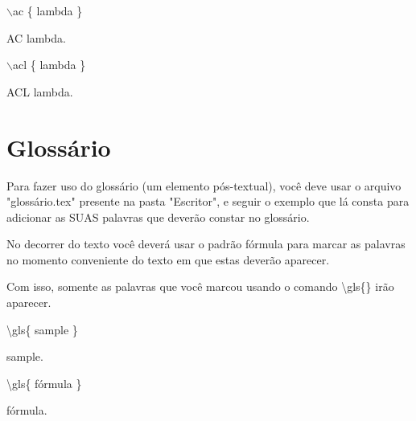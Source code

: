 \hfill

$\backslash$ac \{ lambda \}

AC \ac{lambda}.

$\backslash$acl \{ lambda \}

ACL \acl{lambda}.


\section{Glossário}

Para fazer uso do glossário (um elemento pós-textual), você deve usar o arquivo "glossário.tex" presente na pasta "Escritor", e seguir o exemplo que lá consta para adicionar as SUAS palavras que deverão constar no glossário.

No decorrer do texto você deverá usar o padrão \gls{fórmula} para marcar as palavras no momento conveniente do texto em que estas deverão aparecer.

Com isso, somente as palavras que você marcou usando o comando \textbackslash gls\{\} irão aparecer.

\textbackslash gls\{ sample \}

\gls{sample}.

\hfill

\textbackslash gls\{ fórmula \}

\gls{fórmula}.